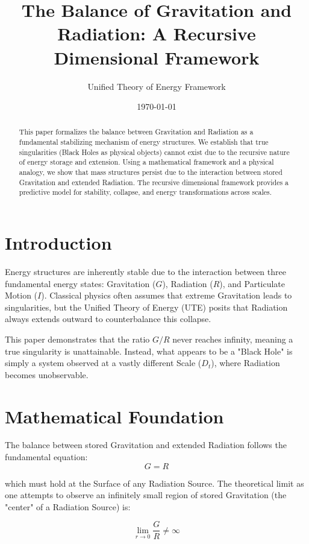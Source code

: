 \documentclass{article}
\title{The Balance of Gravitation and Radiation: A Recursive Dimensional Framework}
\author{Unified Theory of Energy Framework}
\date{\today}
\begin{document}
\maketitle

\begin{abstract}
This paper formalizes the balance between Gravitation and Radiation as a fundamental stabilizing mechanism of energy structures. We establish that true singularities (Black Holes as physical objects) cannot exist due to the recursive nature of energy storage and extension. Using a mathematical framework and a physical analogy, we show that mass structures persist due to the interaction between stored Gravitation and extended Radiation. The recursive dimensional framework provides a predictive model for stability, collapse, and energy transformations across scales.
\end{abstract}

\section{Introduction}
Energy structures are inherently stable due to the interaction between three fundamental energy states: Gravitation ($G$), Radiation ($R$), and Particulate Motion ($I$). Classical physics often assumes that extreme Gravitation leads to singularities, but the Unified Theory of Energy (UTE) posits that Radiation always extends outward to counterbalance this collapse. 

This paper demonstrates that the ratio $G/R$ never reaches infinity, meaning a true singularity is unattainable. Instead, what appears to be a "Black Hole" is simply a system observed at a vastly different Scale ($D_t$), where Radiation becomes unobservable.

\section{Mathematical Foundation}

The balance between stored Gravitation and extended Radiation follows the fundamental equation:
\begin{equation}
    G = R
\end{equation}

which must hold at the Surface of any Radiation Source. The theoretical limit as one attempts to observe an infinitely small region of stored Gravitation (the "center" of a Radiation Source) is:

\begin{equation}
    \lim_{r \to 0} \frac{G}{R} \neq \infty
\end{equation}
\end{document}
